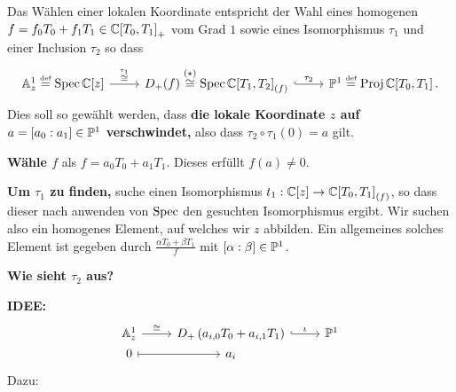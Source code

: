 \begin{comment}
Versuch 2
\end{comment}
Das Wählen einer lokalen Koordinate entspricht der Wahl eines homogenen
$f=f_0T_0+f_1T_1\in\C{[T_0,T_1]}_+$ vom Grad $1$ sowie eines Isomorphismus
$\tau_1$ und einer Inclusion $\tau_2$ so dass
\[ \begin{tikzcd}
\A_z^1\bydef\Spec\C[z] \rar{\overset{\tau_1}\cong} 
  &D_+(f) \overset{(\star)}\cong \Spec \C{[T_1,T_2]}_{(f)} \rar[hook]{\tau_2}
  & \P^1 \bydef \Proj\C[T_0,T_1] \,.
\end{tikzcd} \]
Dies soll so gewählt werden, dass \textbf{\boldmath{}die lokale Koordinate $z$
auf $a=[a_{0}:a_{1}]\in\P^1$ verschwindet,} also dass $\tau_2\circ\tau_1(0)=a$
gilt.

\textbf{\boldmath{}Wähle $f$} als $f=a_{0}T_0+a_{1}T_1$. Dieses erfüllt
$f(a)\neq0$.

\textbf{\boldmath{}Um $\tau_1$ zu finden,} suche einen Isomorphismus
$t_1:\C[z]\to \C{[T_0,T_1]}_{(f)}$, so dass dieser nach anwenden von $\Spec$
den gesuchten Isomorphismus ergibt.
Wir suchen also ein homogenes Element, auf welches wir $z$ abbilden.
Ein allgemeines solches Element ist gegeben durch $\frac{\alpha T_0+\beta
T_1}{f}$ mit $[\alpha:\beta]\in\P^1$.
\begin{comment}
Hier ist $\alpha=a_1$ und $\beta=-a_0$ möglich und damit wird $a$ zu einer
Nullstelle.
\end{comment}

\textbf{\boldmath{}Wie sieht $\tau_2$ aus?}

\begin{comment}
BIS HIER HIN NEU!!
\end{comment}

\textbf{IDEE:}
\[ \begin{tikzcd}[row sep=0]
\A_z^1 \rar{\cong}& D_+\left(a_{i,0}T_0 + a_{i,1}T_1\right) \rar[hook]{\iota}
  & \P^1\\
0 \arrow[|->]{r}& a_i
\end{tikzcd} \]
Dazu:
\begin{comment}
\begin{align*}
D_+\left(a_{i,0}T_0 + a_{i,1}T_1\right)
  &=\Proj \C[T_0,T_1]\Big\backslash
    V_+\Big(\left(a_{i,0}T_0 + a_{i,1}T_1\right)\Big)
\\&\hookrightarrow\P^1
    \qquad \text{~durch~} \qquad a\mapsto a
\end{align*}
\textbf{Fall:} $a=[1:0]$ dann ist $\A^1\cong D_+(T_1)\hookrightarrow \P^1$
durch $x \mapsto (1,z)$
\end{comment}

